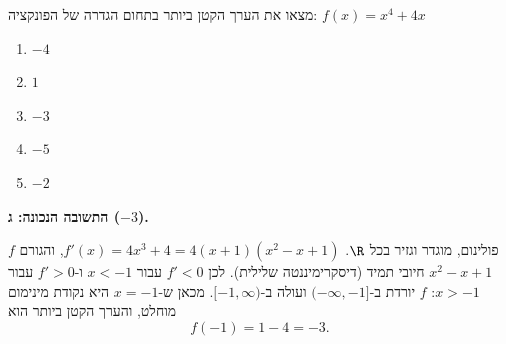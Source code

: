 
\begin{question}
מצאו את הערך הקטן ביותר בתחום הגדרה של הפונקציה: $f(x)=x^4+4x$
\begin{enumerate}
  \item $-4$
  \item $1$
  \item $-3$
  \item $-5$
  \item $-2$
\end{enumerate}
\end{question}

\begin{solution}
\textbf{התשובה הנכונה: ג ($-3$).}

$f$ פולינום, מוגדר וגזיר בכל $\R$. $f'(x)=4x^3+4=4(x+1)(x^2-x+1)$, והגורם $x^2-x+1$ חיובי תמיד (דיסקרימיננטה שלילית). לכן $f'<0$ עבור $x<-1$ ו-$f'>0$ עבור $x>-1$: $f$ יורדת ב-$(-\infty,-1]$ ועולה ב-$[-1,\infty)$. מכאן ש-$x=-1$ היא נקודת מינימום מוחלט, והערך הקטן ביותר הוא
\[ f(-1)=1-4=-3 . \]
\end{solution}
